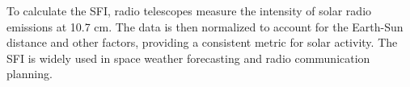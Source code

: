To calculate the SFI, radio telescopes measure the intensity of solar radio emissions at 10.7 cm. The data is then normalized to account for the Earth-Sun distance and other factors, providing a consistent metric for solar activity. The SFI is widely used in space weather forecasting and radio communication planning.

